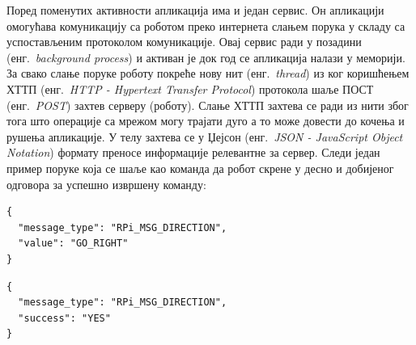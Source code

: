 \documentclass[12pt,oneside]{memoir}
\theoremstyle{remark}
\begin{document}
Поред поменутих активности апликација има и један сервис. Он апликацији омогућава комуникацију са роботом преко интернета слањем порука у складу са успостављеним протоколом комуникације. Овај сервис ради у позадини (енг.~{\em background process}) и активан је док год се апликација налази у меморији. За свако слање поруке роботу покреће нову нит (енг.~{\em thread}) из ког коришћењем ХТТП (енг.~{\em HTTP - Hypertext Transfer Protocol}) протокола шаље ПОСТ (енг.~{\em POST}) захтев серверу (роботу). Слање ХТТП захтева се ради из нити због тога што операције са мрежом могу трајати дуго а то може довести до кочења и рушења апликације. У телу захтева се у Џејсон (енг.~{\em JSON - JavaScript Object Notation}) формату преносе информације релевантне за сервер. Следи један пример поруке која се шаље као команда да робот скрене у десно и добијеног одговора за успешно извршену команду:


\begin{lstlisting}[caption={Пример захтева који се шаље роботу за скретање у десно},captionpos=b]
{
  "message_type": "RPi_MSG_DIRECTION",
  "value": "GO_RIGHT"
}
\end{lstlisting}

\begin{lstlisting}[caption={Пример одговора који се добија од робота за успешно извршену команду},captionpos=b]
{
  "message_type": "RPi_MSG_DIRECTION",
  "success": "YES"
}
\end{lstlisting}
\end{document}
